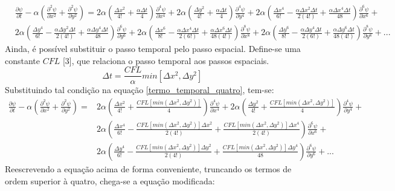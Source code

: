 \documentclass[10pt,twoside,a4paper]{article}
\begin{document}
	\begin{equation} \label{termo_temporal_quatro}
	\begin{split}
	&\frac{\partial \psi}{\partial t} - \alpha \left(\frac{\partial^{2} \psi}{\partial x^{2}} + \frac{\partial^{2} \psi}{\partial y^{2}} \right) = 2\alpha \left(\frac{\Delta x^{2}}{4!} +\frac{\alpha \Delta t}{4}\right) \frac{\partial^{4}\psi}{\partial x^{4}} +2\alpha \left(\frac{\Delta y^{2}}{4!} +\frac{\alpha \Delta t}{4}\right) \frac{\partial^{4}\psi}{\partial y^{4}} + 2\alpha \left(\frac{\Delta x^{4}}{6!} - \frac{\alpha \Delta x^{2}\Delta t}{2(4!)} + \frac{\alpha \Delta x^{4}\Delta t}{48}\right) \frac{\partial^{6}\psi}{\partial x^{6}} + \\
	&2\alpha \left(\frac{\Delta y^{4}}{6!} - \frac{\alpha \Delta y^{2}\Delta t}{2(4!)} + \frac{\alpha \Delta y^{4}\Delta t}{48}\right) \frac{\partial^{6}\psi}{\partial y^{6}} + 2 \alpha \left(\frac{\Delta x^{6}}{8!} - \frac{\alpha \Delta x^{4}\Delta t}{2(6!)} + \frac{\alpha \Delta x^{6}\Delta t}{48(4!)} \right) \frac{\partial^{8}\psi}{\partial x^{8}} + 2 \alpha \left(\frac{\Delta y^{6}}{8!} - \frac{\alpha \Delta y^{4}\Delta t}{2(6!)} + \frac{\alpha \Delta y^{6}\Delta t}{48(4!)} \right) \frac{\partial^{8}\psi}{\partial y^{8}} + ...
	\end{split}
	\end{equation}	
	Ainda, é possível substituir o passo temporal pelo passo espacial. Define-se uma constante $CFL$ [3], que relaciona o passo temporal aos passos espaciais.
	\begin{equation} \label{CFL_one}
	\Delta t = \frac{CFL}{\alpha} min[\Delta x^{2}, \Delta y^{2} ] \ \ \ \ \ 
	\end{equation}
	Substituindo tal condição na equação \ref{termo_temporal_quatro}, tem-se:
	\begin{equation} \label{equacao_modificadaCFL}
	\begin{split}
	\frac{\partial \psi}{\partial t} - \alpha \left(\frac{\partial^{2} \psi}{\partial x^{2}} + \frac{\partial^{2} \psi}{\partial y^{2}} \right) = &2\alpha \left(\frac{\Delta x^{2}}{4!} +\frac{CFL \left[min(\Delta x^{2},\Delta y^{2})\right]}{4}\right) \frac{\partial^{4}\psi}{\partial x^{4}} +2\alpha \left(\frac{\Delta y^{2}}{4!} +\frac{CFL \left[min(\Delta x^{2},\Delta y^{2})\right]}{4}\right) \frac{\partial^{4}\psi}{\partial y^{4}} +\\
	&2\alpha \left(\frac{\Delta x^{4}}{6!} - \frac{CFL \left[min(\Delta x^{2},\Delta y^{2})\right] \Delta x^{2} }{2(4!)} + \frac{CFL \left[min(\Delta x^{2},\Delta y^{2})\right]\Delta x^{4}}{2(4!)}\right) \frac{\partial^{6}\psi}{\partial x^{6}} + \\
	&2\alpha \left(\frac{\Delta y^{4}}{6!} - \frac{CFL \left[min(\Delta x^{2},\Delta y^{2})\right] \Delta y^{2}}{2(4!)} + \frac{CFL \left[min(\Delta x^{2},\Delta y^{2})\right] \Delta y^{4}}{48}\right) \frac{\partial^{6}\psi}{\partial y^{6}} + ...
	\end{split}
	\end{equation}
	Reescrevendo a equação acima de forma conveniente, truncando os termos de ordem superior à quatro, chega-se a equação modificada:
\end{document}
